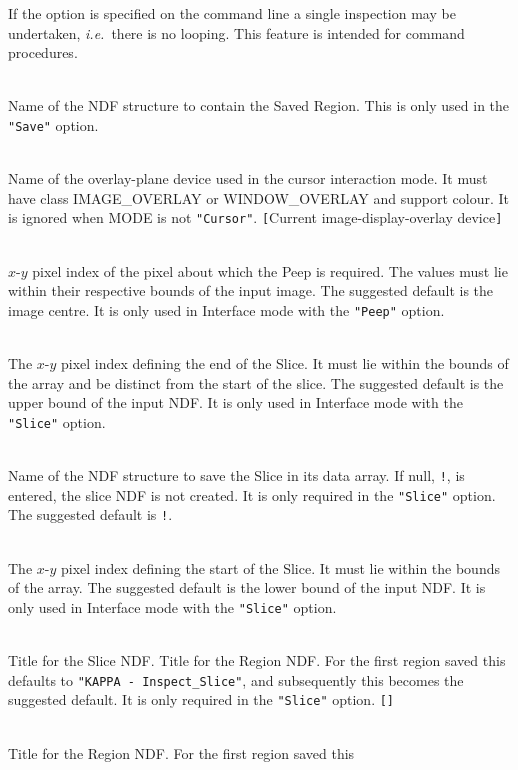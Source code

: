 \documentclass[twoside,11pt]{article}
\newcommand{\sstsubsection}[1]{ \item[{#1}] \mbox{} \\}
\newcommand{\sstsubsection}[1]{\item[{#1}]}
\begin{document}
{{{         If the option is specified on the command line a single
         inspection may be undertaken, {\it i.e.}\  there is no looping.  This
         feature is intended for command procedures.
      }
      \sstsubsection{
         OUT = NDF (Read)
      }{
         Name of the NDF structure to contain the Saved Region.  This
         is only used in the {\tt "Save"} option.
      }
      \sstsubsection{
         OVERLAY = DEVICE (Read)
      }{
         Name of the overlay-plane device used in the cursor interaction
         mode.  It must have class IMAGE\_OVERLAY or WINDOW\_OVERLAY and
         support colour.  It is ignored when MODE is not {\tt "Cursor"}.
         {\tt [}Current image-display-overlay device{\tt ]}
      }
      \sstsubsection{
         PEIND( 2 ) = \_INTEGER (Read)
      }{
         $x$-$y$ pixel index of the pixel about which the Peep is required.
         The values must lie within their respective bounds of the
         input image.  The suggested default is the image centre.  It
         is only used in Interface mode with the {\tt "Peep"} option.
      }
      \sstsubsection{
         SLEND( 2 ) = \_INTEGER (Read)
      }{
         The $x$-$y$ pixel index defining the end of the Slice.  It
         must lie within the bounds of the array and be distinct from
         the start of the slice.  The suggested default is the upper
         bound of the input NDF.  It is only used in Interface mode
         with the {\tt "Slice"} option.
      }
      \sstsubsection{
         SLICE = NDF (Read)
      }{
         Name of the NDF structure to save the Slice in its data array.
         If null, {\tt !}, is entered, the slice NDF is not created.
         It is only required in the {\tt "Slice"} option.  The
         suggested default is {\tt !}.
      }
      \sstsubsection{
         SLSTART( 2 ) = \_INTEGER (Read)
      }{
         The $x$-$y$ pixel index defining the start of the Slice.  It must
         lie within the bounds of the array.  The suggested default is
         the lower bound of the input NDF.  It is only used in
         Interface mode with the {\tt "Slice"} option.
      }
      \sstsubsection{
         SLTITLE = LITERAL (Read)
      }{
         Title for the Slice NDF.  Title for the Region NDF.  For the
         first region saved this defaults to {\tt "KAPPA - Inspect\_Slice"},
         and subsequently this becomes the suggested default.  It is
         only required in the {\tt "Slice"} option. {\tt []}
      }
      \sstsubsection{
         TITLE = LITERAL (Read)
      }{
         Title for the Region NDF.  For the first region saved this
}}}
\end{document}

